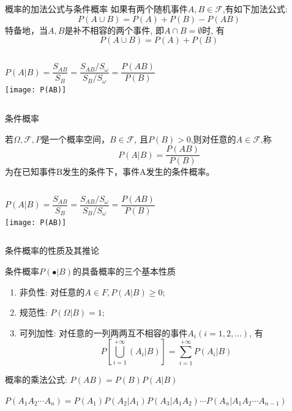 \begin{frame}{概率的加法公式与条件概率}
如果有两个随机事件$A,B\in\mathcal{F}$,有如下加法公式:
\[P(A\cup B)=P(A)+P(B)-P(AB)\]
特备地，当$A,B$是补不相容的两个事件, 即$A\cap B=\emptyset$时, 有
\[P(A\cup B)=P(A)+P(B)\]

\begin{columns}
	\[P(A|B)=\frac{S_{AB}}{S_B}=\frac{S_{AB}/S_\omega}{S_B/S_\omega}=\frac{P(AB)}{P(B)} \]
	\texttt{[image: P(AB)]}
\end{columns}
\end{frame}

\begin{frame}{条件概率}
\begin{definition}
	若$\Omega,\mathcal{F},P$是一个概率空间，$B\in\mathcal{F}$, 且$P(B)>0$,则对任意的$A\in\mathcal{F}$,称
	$$P(A|B)=\frac{P(AB)}{P(B)}$$
	为在已知事件B发生的条件下，事件A发生的条件概率。
\end{definition}

\begin{columns}%
\[P(A|B)=\frac{S_{AB}}{S_B}=\frac{S_{AB}/S_\omega}{S_B/S_\omega}=\frac{P(AB)}{P(B)} \]
\texttt{[image: P(AB)]}
\end{columns}
\end{frame}

\begin{frame}{条件概率的性质及其推论}
\begin{block}{条件概率$P(\bullet|B)$的具备概率的三个基本性质}
	\begin{enumerate}
		\item 非负性: 对任意的$A\in F, P(A|B)\ge 0$;
		\item 规范性: $P(\Omega|B)=1$;
		\item 可列加性: 对任意的一列两两互不相容的事件$A_i(i=1,2,\dots)$, 有
		\[P\left[\bigcup\limits_{i=1}^{+\infty}(A_i|B)\right]=\sum\limits_{i=1}^{+\infty}P(A_i|B) \]
	\end{enumerate}
\end{block}
\begin{corollary}
概率的乘法公式:  $P(AB)=P(B)P(A|B)$
\end{corollary}

\begin{corollary}
	$P(A_1A_2\cdots A_n)=P(A_1)P(A_2|A_1)P(A_3|A_1A_2)\cdots P(A_n|A_1A_2\cdots A_{n-1})$
\end{corollary}
\end{frame}


